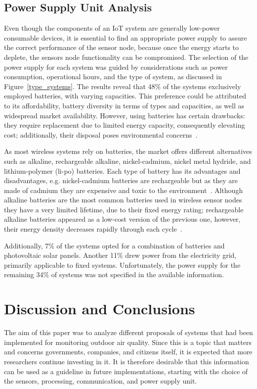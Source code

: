\documentclass[10pt]{../style_src/imeko_acta}
\begin{document}
\subsection{Power Supply Unit Analysis}\label{PSUA}
Even though the components of an IoT system are generally low-power consumable devices, it is essential to find an appropriate power supply to assure the correct performance of the sensor node, because once the energy starts to deplete, the sensors node functionality can be compromised. The selection of the power supply for each system was guided by considerations  such as power consumption, operational hours, and the type of system, as discussed in Figure~\ref{type_systems}. The results reveal that 48\% of the systems exclusively employed batteries, with varying capacities. This preference could be attributed to its affordability, battery diversity in terms of types and capacities, as well as widespread market availability. However, using batteries has certain drawbacks: they require replacement due to limited energy capacity, consequently elevating cost; additionally, their disposal poses environmental concerns~\cite{somov2015powering}. 

As most wireless systems rely on batteries, the market offers different alternatives such as alkaline, rechargeable alkaline, nickel-cadmium, nickel metal hydride, and lithium-polymer (li-po) batteries. Each type of battery has its advantages and disadvantages, e.g. nickel-cadmium batteries are rechargeable but as they are made of cadmium they are expensive and toxic to the environment~\cite{wenqi2014power}. Although alkaline batteries are the most common batteries used in wireless sensor nodes they have a very limited lifetime, due to their fixed energy rating; rechargeable alkaline batteries appeared as a low-cost version of the previous one, however, their energy density decreases rapidly through each cycle~\cite{wenqi2014power}.  

Additionally, 7\% of the systems opted for a combination of batteries and photovoltaic solar panels. Another 11\% drew power from the electricity grid, primarily applicable to fixed systems. Unfortunately, the power supply for the remaining 34\% of systems was not specified in the available information.

\section{Discussion and Conclusions}

The aim of this paper was to analyze different proposals of systems that had been implemented for monitoring outdoor air quality. Since this is a topic that matters and concerns governments, companies, and citizens itself, it is expected that more researchers continue investing in it. It is therefore desirable that this information can be used as a guideline in future implementations, starting with the choice of the sensors, processing, communication, and power supply unit. 
\end{document}
